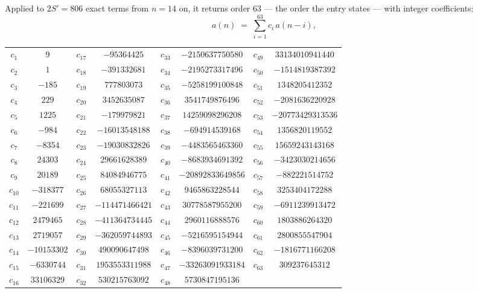 \documentclass[11pt,a4paper]{article}
\theoremstyle{plain}
\theoremstyle{definition}
\begin{document}
Applied to $2S'=806$ exact terms from $n=14$ on, it returns order $63$ --- the
order the entry states --- with integer coefficients:
\[
a(n)\;=\;\sum_{i=1}^{63}c_i\,a(n-i),
\]
\begin{center}\small
\begin{tabular}{cccccccc}
$c_{1}$ & $9$ & $c_{17}$ & $-95364425$ & $c_{33}$ & $-2150637750580$ & $c_{49}$ & $33134010941440$ \\
$c_{2}$ & $1$ & $c_{18}$ & $-391332681$ & $c_{34}$ & $-2195273317496$ & $c_{50}$ & $-1514819387392$ \\
$c_{3}$ & $-185$ & $c_{19}$ & $777803073$ & $c_{35}$ & $-5258199100848$ & $c_{51}$ & $1348205412352$ \\
$c_{4}$ & $229$ & $c_{20}$ & $3452635087$ & $c_{36}$ & $3541749876496$ & $c_{52}$ & $-2081636220928$ \\
$c_{5}$ & $1225$ & $c_{21}$ & $-179979821$ & $c_{37}$ & $14259098296208$ & $c_{53}$ & $-20773429313536$ \\
$c_{6}$ & $-984$ & $c_{22}$ & $-16013548188$ & $c_{38}$ & $-694914539168$ & $c_{54}$ & $1356820119552$ \\
$c_{7}$ & $-8354$ & $c_{23}$ & $-19030832826$ & $c_{39}$ & $-4483565463360$ & $c_{55}$ & $15659243143168$ \\
$c_{8}$ & $24303$ & $c_{24}$ & $29661628389$ & $c_{40}$ & $-8683934691392$ & $c_{56}$ & $-3423030214656$ \\
$c_{9}$ & $20189$ & $c_{25}$ & $84084946775$ & $c_{41}$ & $-20892833649856$ & $c_{57}$ & $-882221514752$ \\
$c_{10}$ & $-318377$ & $c_{26}$ & $68055327113$ & $c_{42}$ & $9465863228544$ & $c_{58}$ & $3253404172288$ \\
$c_{11}$ & $-221699$ & $c_{27}$ & $-114471466421$ & $c_{43}$ & $30778587955200$ & $c_{59}$ & $-6911239913472$ \\
$c_{12}$ & $2479465$ & $c_{28}$ & $-411364734445$ & $c_{44}$ & $2960116888576$ & $c_{60}$ & $1803886264320$ \\
$c_{13}$ & $2719057$ & $c_{29}$ & $-362059744893$ & $c_{45}$ & $-5216595154944$ & $c_{61}$ & $2800855547904$ \\
$c_{14}$ & $-10153302$ & $c_{30}$ & $490090647498$ & $c_{46}$ & $-8396039731200$ & $c_{62}$ & $-1816771166208$ \\
$c_{15}$ & $-6330744$ & $c_{31}$ & $1953553311988$ & $c_{47}$ & $-33263091933184$ & $c_{63}$ & $309237645312$ \\
$c_{16}$ & $33106329$ & $c_{32}$ & $530215763092$ & $c_{48}$ & $5730847195136$ &  &  \\
\end{tabular}
\end{center}
\end{document}
